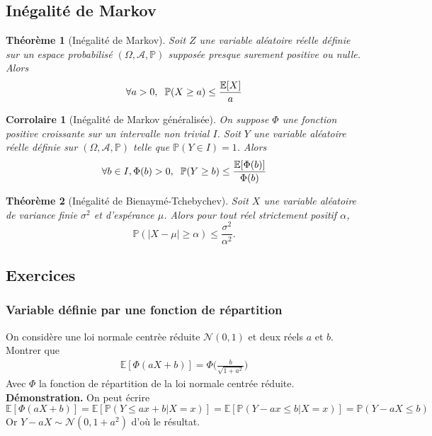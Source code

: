 \documentclass[a4paper]{article}
\newtheorem{theorem}{Théorème}[section]
\newtheorem{corrolaire}{Corrolaire}
\begin{document}
\subsection{Inégalité de Markov}
\begin{theorem}[Inégalité de Markov]
Soit $Z$ une variable aléatoire réelle définie sur un espace probabilisé $(\Omega, \mathcal{A}, \mathbb{P})$ supposée presque surement positive ou nulle. Alors
\begin{equation}
    \forall a > 0, \hspace{2mm} \mathbb{P}(X \geq a) \leq \frac{\mathbb{E}[X]}{a}
\end{equation}
\end{theorem}
\begin{corrolaire}[Inégalité de Markov généralisée] On suppose $\Phi$ une fonction positive croissante sur un intervalle non trivial $I$. Soit $Y$ une variable aléatoire réelle définie sur $(\Omega, \mathcal{A}, \mathbb{P})$ telle que $\mathbb{P}(Y \in I) = 1$. Alors
\begin{equation}
    \forall b \in I, \Phi(b) > 0, \hspace{2mm} \mathbb{P}(Y \geq b) \leq \frac{\mathbb{E}[\Phi(b)]}{\Phi(b)}
\end{equation}
\end{corrolaire}
\begin{theorem}[Inégalité de Bienaymé-Tchebychev] Soit $X$ une variable aléatoire de variance finie $\sigma^2$ et d'espérance $\mu$. Alors pour tout réel strictement positif $\alpha$,
\begin{equation}
    \mathbb{P}(|X - \mu| \geq \alpha) \leq \frac{\sigma^2}{\alpha^2}.
\end{equation}
\end{theorem}
\subsection{Exercices}
\subsubsection{Variable définie par une fonction de répartition}
On considère une loi normale centrèe réduite $\mathcal{N}(0,1)$ et deux réels $a$ et $b$. Montrer que 
\begin{align*}
    \mathbb{E}[\Phi(aX+b)] = \Phi\bigg(\frac{b}{\sqrt{1+a^2}}\bigg)
\end{align*}
Avec $\Phi$ la fonction de répartition de la loi normale centrée réduite.
\vspace{0.5mm}
\textbf{Démonstration.} On peut écrire
\begin{equation*}
    \mathbb{E}[\Phi(aX+b)] =  \mathbb{E}[\mathbb{P}(Y \leq ax+b | X=x)] =  \mathbb{E}[\mathbb{P}(Y-ax \leq b | X=x)]  = \mathbb{P}(Y -aX\leq b)
\end{equation*}
Or $Y-aX \sim\mathcal{N}(0, 1+a^2)$ d'où le résultat.
\end{document}
